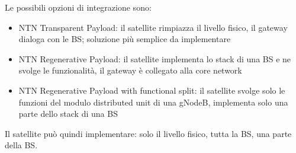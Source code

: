 \begin{questions}
\begin{solution}
        Le possibili opzioni di integrazione sono: 
        \begin{itemize}
            \item NTN Transparent Payload: il satellite rimpiazza il livello fisico, il gateway dialoga con le BS; soluzione più semplice da implementare
            
            \item NTN Regenerative Payload: il satellite implementa lo stack di una BS e ne svolge le funzionalità, il gateway è collegato alla core network
            
            \item NTN Regenerative Payload with functional split: il satellite svolge solo le funzioni del modulo distributed unit di una gNodeB, implementa solo una parte dello stack di una BS
        \end{itemize}
        
        Il satellite può quindi implementare: solo il livello fisico, tutta la BS, una parte della BS.
    \end{solution}
\end{questions}
